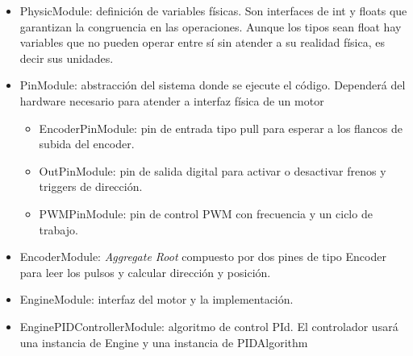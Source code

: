 \begin{itemize}
    \item PhysicModule: definición de variables físicas.
    Son interfaces de int y floats que garantizan la congruencia en las operaciones.
    Aunque los tipos sean float hay variables que no pueden operar entre sí sin atender a su realidad física, es decir sus unidades.
    \item PinModule: abstracción del sistema donde se ejecute el código.
    Dependerá del hardware necesario para atender a interfaz física de un motor
    \begin{itemize}
        \item EncoderPinModule: pin de entrada tipo pull para esperar a los flancos de subida del encoder.
        \item OutPinModule: pin de salida digital para activar o desactivar frenos y triggers de dirección.
        \item PWMPinModule: pin de control PWM con frecuencia y un ciclo de trabajo.
    \end{itemize}
    \item EncoderModule: \textit{Aggregate Root } compuesto por dos pines de tipo Encoder para leer los pulsos y calcular dirección y posición.
    \item EngineModule: interfaz del motor y la implementación.
    \item EnginePIDControllerModule: algoritmo de control PId.
    El controlador usará una instancia de Engine y una instancia de PIDAlgorithm
\end{itemize}


